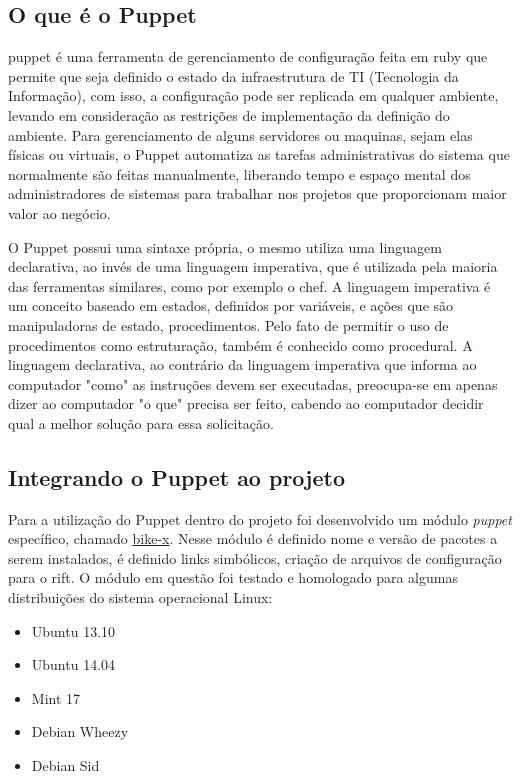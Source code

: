 \subsection{O que é o Puppet} %
\label{sub:o_que_o_puppet}

\gls{puppet} é uma ferramenta de gerenciamento de configuração feita em \gls{ruby} que permite que seja definido o estado da infraestrutura de TI (Tecnologia da Informação), com isso, a configuração pode ser replicada em qualquer ambiente, levando em consideração as restrições de implementação da definição do ambiente. Para gerenciamento de alguns servidores ou maquinas, sejam elas físicas ou virtuais, o Puppet automatiza as tarefas administrativas do sistema que normalmente são feitas manualmente, liberando tempo e espaço mental dos administradores de sistemas para trabalhar nos projetos que proporcionam maior valor ao negócio.

O Puppet possui uma sintaxe própria, o mesmo utiliza uma linguagem declarativa, ao invés de uma linguagem imperativa, que é utilizada pela maioria das ferramentas similares, como por exemplo o \gls{chef}. A linguagem imperativa é um conceito baseado em estados, definidos por variáveis, e ações que são manipuladoras de estado, procedimentos. Pelo fato de permitir o uso de procedimentos como estruturação, também é conhecido como procedural. A linguagem declarativa, ao contrário da linguagem imperativa que informa ao computador "como" as instruções devem ser executadas, preocupa-se em apenas dizer ao computador "o que" precisa ser feito, cabendo ao computador decidir qual a melhor solução para essa solicitação.
 

\subsection{Integrando o Puppet ao projeto} %
\label{sub:integrando_o_puppet_ao_projeto}

Para a utilização do Puppet dentro do projeto foi desenvolvido um módulo \textit{puppet} específico, chamado \href{https://github.com/start-x/startx-src/tree/master/puppet}{bike-x}. Nesse módulo é definido nome e versão de pacotes a serem instalados, é definido links simbólicos, criação de arquivos de configuração para o \gls{rift}. O módulo em questão foi testado e homologado para algumas distribuições do sistema operacional Linux:

\begin{itemize}
\item Ubuntu 13.10
\item Ubuntu 14.04
\item Mint 17
\item Debian Wheezy
\item Debian Sid
\end{itemize}

